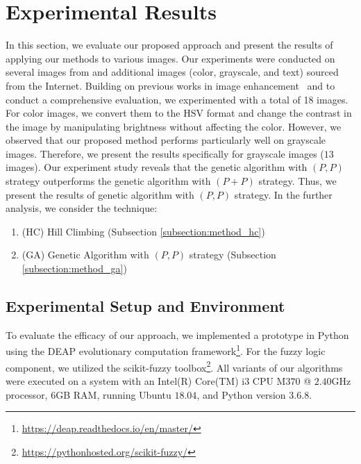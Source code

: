  \section{Experimental Results}
 \label{section:experiment}
In this section, we evaluate our proposed approach and present the results of applying our methods to various images. 
Our experiments were conducted on several images from \cite{draa2014artificial} and additional images (color, grayscale, and text) sourced from the Internet. 
Building on previous works in image enhancement~\cite{draa2014artificial, bhandari2020cuckoo, samanta2018log} and to conduct a comprehensive evaluation, we experimented with a total of 18 images. 
For color images, we convert them to the HSV format and change the contrast in the image by manipulating brightness without affecting the color. 
However, we observed that our proposed method performs particularly well on grayscale images. 
Therefore, we present the results specifically for grayscale images ($13$ images).
Our experiment study reveals that the genetic algorithm with $(P,P)$ strategy outperforms the genetic algorithm with $(P+P)$ strategy. Thus, we present the results of genetic algorithm with $(P,P)$ strategy.
In the further analysis, we consider the technique:
\begin{enumerate}
  \item (HC) Hill Climbing (Subsection \ref{subsection:method_hc})
  \item (GA) Genetic Algorithm with $(P, P)$ strategy (Subsection \ref{subsection:method_ga})
\end{enumerate}
\subsection{Experimental Setup and Environment}
To evaluate the efficacy of our approach, we implemented a prototype in Python using the DEAP evolutionary computation framework\footnote{\url{https://deap.readthedocs.io/en/master/}}. For the fuzzy logic component, we utilized the scikit-fuzzy toolbox\footnote{\url{https://pythonhosted.org/scikit-fuzzy/}}.
All variants of our algorithms were executed on a system with an Intel(R) Core(TM) i$3$ CPU M$370$ @ $2.40$GHz processor, $6$GB RAM, running Ubuntu $18.04$, and Python version $3.6.8$.
